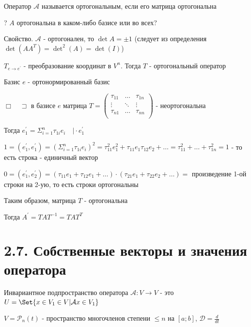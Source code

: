 \documentclass[12pt]{article}
\begin{document}
    \Def Оператор $\mathcal{A}$ называется ортогональным, если его матрица ортогональна

    ? $A$ ортогональна в каком-либо базисе или во всех?

    Свойство. $\mathcal{A}$ - ортогонален, то $\det A = \pm 1$ (следует из определения $\displaystyle \det(AA^T) = \det^2(A) = \det(I)$)

    \Th $\displaystyle T_{e\to e^\prime}$ - преобразование координат в $\displaystyle V^n$. Тогда $T$ - ортогональный оператор

    Базис $e$ - ортонормированный базис

    $\Box \quad \sqsupset $ в базисе $e$ матрица $\displaystyle T = \begin{pmatrix}
          \tau_{11} & \dots & \tau_{1n} \\
          \vdots & \ddots & \vdots \\
          \tau_{n1} & \dots & \tau_{nn} \\
    \end{pmatrix}$ - неортогональна

    Тогда $\displaystyle e_1^\prime = \Sigma_{i=1}^n \tau_{1i} e_i \quad \Big| \cdot e_1^\prime$

    $\displaystyle 1 = (e_1^\prime, e_1^\prime) = (\Sigma_{i=1}^n \tau_{1i} e_i)^2 =
    \tau^2_{11} e^2_1 + \tau_{11} e_1 \tau_{12} e_2 + \dots = \tau_{11}^2 + \dots + \tau_{1n}^2 = 1$ - то есть строка - единичный вектор

    $\displaystyle 0 = (e_1^\prime, e_2^\prime) = (\tau_{11} e_1 + \tau_{12}e_1 + \dots) \cdot
    (\tau_{21}e_1 + \tau_{22}e_2 + \dots) = $ произведение 1-ой строки на 2-ую, то есть строки ортогональны

    Таким образом, матрица $T$ - ортогональна

    \Nota Тогда $\displaystyle A^\prime = T A T^{-1} = T A T^T$

    \section{2.7. Собственные векторы и значения оператора}

    \Def Инвариантное подпространство оператора $\mathcal{A} : V \rightarrow V$ -
    это $\displaystyle U = \Set{x \in V_1 \in V | \mathcal{A}x \in V_1}$

    \Ex $\displaystyle V = \mathcal{P}_n(t)$ - пространство многочленов степени $\leq n$ на $[a; b]$, $\displaystyle \mathcal{D} = \frac{d}{dt}$
\end{document}
